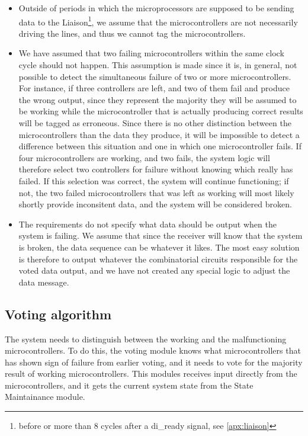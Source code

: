 \begin{itemize}
\item Outside of periods in which the microprocessors are supposed to
  be sending data to the Liaison\footnote{before or more than 8 cycles
    after a {\ttfamily di\_ready} signal, see \autoref{apx:liaison}},
  we assume that the microcontrollers are not necessarily driving the
  lines, and thus we cannot tag the microcontrollers.

\item We have assumed that two failing microcontrollers within the
  same clock cycle should not happen. This assumption is made since it
  is, in general, not possible to detect the simultaneous failure of
  two or more microcontrollers. For instance, if three controllers are
  left, and two of them fail and produce the wrong output, since they
  represent the majority they will be assumed to be working while the
  microcontroller that is actually producing correct results will be
  tagged as erroneous. Since there is no other distinction between the
  microcontrollers than the data they produce, it will be impossible
  to detect a difference between this situation and one in which one
  microcontroller fails. If four microcontrollers are working, and two
  fails, the system logic will therefore select two controllers for
  failure without knowing which really has failed. If this selection
  was correct, the system will continue functioning; if not, the two
  failed microcontrollers that was left as working will most likely
  shortly provide inconsitent data, and the system will be considered
  broken.

\item The requirements do not specify what data should be output when
  the system is failing. We assume that since the receiver will know
  that the system is broken, the data sequence can be whatever it
  likes. The most easy solution is therefore to output whatever the
  combinatorial circuits responsible for the voted data output, and we
  have not created any special logic to adjust the data message.

\end{itemize}


\subsection{Voting algorithm}
\label{sec:votingalgorithm}
The system needs to distinguish between the working and the
malfunctioning microcontrollers. To do this, the voting module knows
what microcontrollers that has shown sign of failure from earlier
voting, and it needs to vote for the majority result of working
microcontrollers. This modules receives input directly from the
microcontrollers, and it gets the current system state from the State
Maintainance module.


